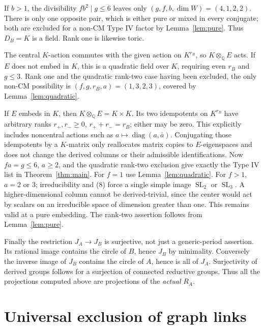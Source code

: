 \documentclass[11pt]{article}
\newcommand{\Q}{\mathbb Q}
\DeclareMathOperator{\SL}{SL}
\theoremstyle{remark}
\begin{document}
If $b>1$, the divisibility $fb^2\mid g\leq6$ leaves only
$(g,f,b,\dim W)=(4,1,2,2)$. There is only one opposite pair,
which is either pure or mixed in every conjugate; both are
excluded for a non-CM Type IV factor by Lemma~\ref{lem:pure}.
Thus $D_B=K$ is a field. Rank one is likewise toric.

The central $K$-action commutes with the given action on
$K^{r_B}$, so $K\otimes_\Q E$ acts. If $E$ does not embed in
$K$, this is a quadratic field over $K$, requiring even $r_B$
and $g\leq3$. Rank one and the quadratic rank-two case having
been excluded, the only non-CM possibility is
$(f,g,r_B,a)=(1,3,2,3)$, covered by Lemma~\ref{lem:quadratic}.

If $E$ embeds in $K$, then $K\otimes_\Q E=K\times K$.
Its two idempotents on $K^{r_B}$ have arbitrary ranks
$r_+,r_-\geq0$, $r_++r_-=r_B$; either may be zero.
This explicitly includes noncentral actions such as
$a\mapsto\operatorname{diag}(a,\bar a)$.
Conjugating those idempotents by a $K$-matrix only reallocates
matrix copies to $E$-eigenspaces and does not change the derived
columns or their admissible identifications.
Now $fa=g\leq6$, $a\geq2$, and the quadratic rank-two exclusion
give exactly the Type IV list in Theorem~\ref{thm:main}.
For $f=1$ use Lemma~\ref{lem:quadratic}. For $f>1$, $a=2$ or
$3$; irreducibility and (8) force a single simple image
$\SL_2$ or $\SL_3$. A higher-dimensional column cannot be
derived-trivial, since the center would act by scalars on an
irreducible space of dimension greater than one. This remains
valid at a pure embedding. The rank-two assertion follows from
Lemma~\ref{lem:pure}.

Finally the restriction $J_A\to J_B$ is surjective, not just a
generic-period assertion. Its rational image contains the circle of
$B$, hence $J_B$ by minimality. Conversely the inverse image of
$J_B$ contains the circle of $A$, hence is all of $J_A$.
Surjectivity of derived groups follows for a surjection of connected
reductive groups. Thus all the projections computed above are
projections of the \emph{actual} $R_A$.

\section{Universal exclusion of graph links}
\end{document}
